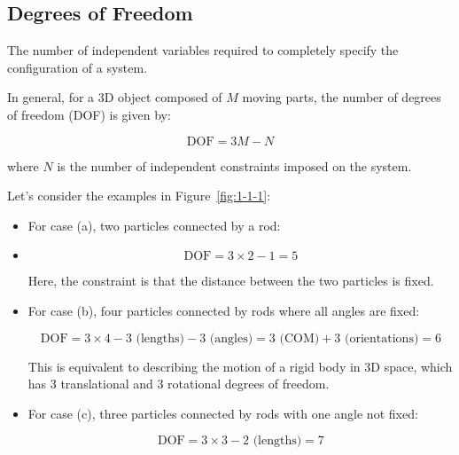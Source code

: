 \subsection{Degrees of Freedom}

\begin{definition}
    The number of independent variables required to completely specify the configuration 
    of a system.
\end{definition}

In general, for a 3D object composed of $M$ moving parts, the number of degrees of 
freedom (DOF) is given by:

\begin{equation}
    \text{DOF} = 3M - N
\end{equation}

where $N$ is the number of independent constraints imposed on the system.

Let's consider the examples in Figure~\ref{fig:1-1-1}:

\begin{itemize}
    \item For case (a), two particles connected by a rod:
    \item 
        \begin{equation}
            \text{DOF} = 3 \times 2 - 1 = 5
        \end{equation}

        Here, the constraint is that the distance between the two particles is fixed.

    \item For case (b), four particles connected by rods where all angles are fixed:

        \begin{equation}
            \text{DOF} = 3 \times 4 - 3 \text{ (lengths)} - 3 \text{ (angles)} = 3 \text{ (COM)} + 3 \text{ (orientations)} = 6
        \end{equation}

        This is equivalent to describing the motion of a rigid body in 3D space, which 
        has 3 translational and 3 rotational degrees of freedom.

    \item For case (c), three particles connected by rods with one angle not fixed:

        \begin{equation}
            \text{DOF} = 3 \times 3 - 2 \text{ (lengths)} = 7
        \end{equation}
\end{itemize}

